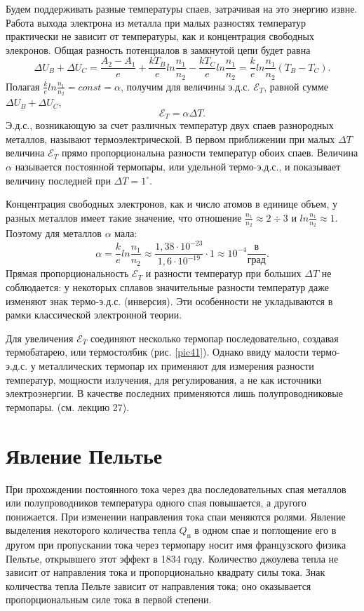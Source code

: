 \documentclass[a4paper,10pt]{book}
\begin{document}
Будем поддерживать разные температуры спаев, затрачивая на это энергию извне. Работа выхода электрона из металла при малых разностях температур практически не зависит от температуры, как и концентрация свободных элекронов. Общая разность потенциалов в замкнутой цепи будет равна
\begin{equation}\label{197}
 \Delta U_B + \Delta U_C = \frac{A_2 - A_1}{e} + \frac{kT_B}{e}ln\frac{n_1}{n_2} - \frac{kT_C}{e}ln\frac{n_1}{n_2} = \frac{k}{e}ln\frac{n_1}{n_2}(T_B - T_C).
\end{equation}
Полагая $\frac{k}{e}ln\frac{n_1}{n_2} = const = \alpha$, получим для величины э.д.с. $\mathcal{E}_T$, равной сумме $\Delta U_B + \Delta U_C$,
\begin{equation}\label{198}
 \mathcal{E}_T = \alpha\Delta T.
\end{equation}
Э.д.с., возникающую за счет различных температур двух спаев разнородных металлов, называют термоэлектрической. В первом приближении при малых $\Delta T$ величина $\mathcal{E}_T$ прямо пропорциональна разности температур обоих спаев. Величина $\alpha$ называется постоянной термопары, или удельной термо-э.д.с., и показывает величину последней при $\Delta T = 1^\circ$.

Концентрация свободных электронов, как и число атомов в единице объем, у разных металлов имеет такие значение, что отношение $\frac{n_1}{n_2} \approx 2 \div 3$ и $ln\frac{n_1}{n_2} \approx 1$. Поэтому для металлов $\alpha$ мала:
\begin{equation*}
 \alpha = \frac{k}{e}ln\frac{n_1}{n_2} \approx \frac{1,38\cdot 10^{-23}}{1,6\cdot 10^{-19}}\cdot 1 \approx 10^{-4}\frac{\text{в}}{\text{град}}.
\end{equation*}
Прямая пропорциональность $\mathcal{E}_T$ и разности температур при больших $\Delta T$ не соблюдается: у некоторых сплавов значительные разности температур даже изменяют знак термо-э.д.с. (инверсия). Эти особенности не укладываются в рамки классической электронной теории.

Для увеличения $\mathcal{E}_T$ соединяют несколько термопар последовательно, создавая термобатарею, или термостолбик (рис. \ref{pic41}).
Однако ввиду малости термо-э.д.с. у металлических термопар их применяют для измерения разности температур, мощности излучения, для регулирования, а не как источники электроэнергии. В качестве последних применяются лишь полупроводниковые термопары. (см. лекцию 27).
\section{Явление Пельтье}
При прохождении постоянного тока через два последовательных спая металлов или полупроводников температура одного спая повышается, а другого понижается. При изменении направления тока спаи меняются ролями. Явление выделения некоторого количества тепла $Q_\text{п}$ в одном спае и поглощение его в другом при пропускании тока через термопару носит имя французского физика Пельтье, открывшего этот эффект в 1834 году. Количество джоулева тепла не зависит от направления тока и пропорционально квадрату силы тока. Знак количества тепла Пельте зависит от направления тока; оно оказывается пропорциональным силе тока в первой степени.
\end{document}

